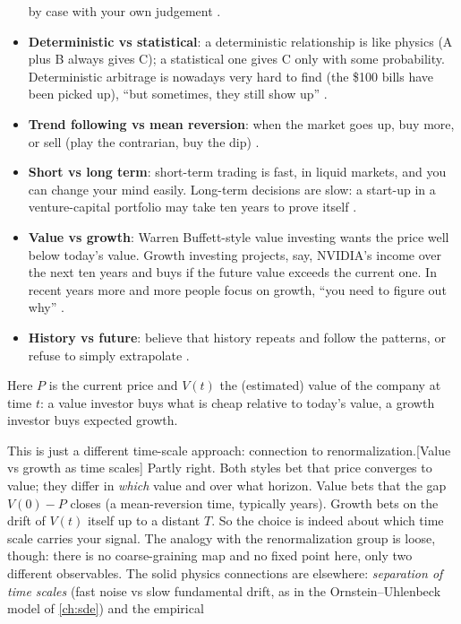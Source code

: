 \begin{paracol}{2}
\begin{itemize}
        by case with your own judgement .
  \item \textbf{Deterministic vs statistical}: a deterministic relationship is like physics (A plus
        B always gives C); a statistical one gives C only with some probability. Deterministic
        arbitrage is nowadays very hard to find (the \$100 bills have been picked up), ``but sometimes,
        they still show up'' .
  \item \textbf{Trend following vs mean reversion}: when the market goes up, buy more, or sell
        (play the contrarian, buy the dip) .
  \item \textbf{Short vs long term}: short-term trading is fast, in liquid markets, and you can
        change your mind easily. Long-term decisions are slow: a start-up in a venture-capital
        portfolio may take ten years to prove itself .
  \item \textbf{Value vs growth}: Warren Buffett-style value investing wants the price well below
        today's value. Growth investing projects, say, NVIDIA's income over the next ten years and buys
        if the future value exceeds the current one. In recent years more and more people focus on
        growth, ``you need to figure out why'' .
  \item \textbf{History vs future}: believe that history repeats and follow the patterns, or refuse
        to simply extrapolate .
\end{itemize}
Here $P$ is the current price and $V(t)$ the (estimated) value of the company at time $t$: a value
investor buys what is cheap relative to today's value, a growth investor buys expected growth. \begin{answer}{This is just a different time-scale approach: connection to renormalization.}[Value vs growth as time scales]
Partly right. Both styles bet that price converges to value; they differ in \emph{which} value and
over what horizon. Value bets that the gap $V(0)-P$ closes (a mean-reversion time, typically
years). Growth bets on the drift of $V(t)$ itself up to a distant $T$. So the choice is indeed about
which time scale carries your signal. The analogy with the renormalization group is loose, though:
there is no coarse-graining map and no fixed point here, only two different observables. The
solid physics connections are elsewhere: \emph{separation of time scales} (fast noise vs slow
fundamental drift, as in the Ornstein--Uhlenbeck model of \cref{ch:sde}) and the empirical

\end{answer}
\end{paracol}
